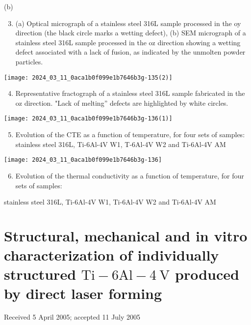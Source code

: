 \documentclass[10pt]{article}
\begin{document}
(b)

\begin{enumerate}
  \setcounter{enumi}{2}
  \item (a) Optical micrograph of a stainless steel 316L sample processed in the oy direction (the black circle marks a wetting defect), (b) SEM micrograph of a stainless steel 316L sample processed in the oz direction showing a wetting defect associated with a lack of fusion, as indicated by the unmolten powder particles.
\end{enumerate}

\begin{center}
\texttt{[image: 2024\_03\_11\_0aca1b0f099e1b7646b3g-135(2)]}
\end{center}

\begin{enumerate}
  \setcounter{enumi}{3}
  \item Representative fractograph of a stainless steel 316L sample fabricated in the oz direction. "Lack of melting” defects are highlighted by white circles.
\end{enumerate}

\begin{center}
\texttt{[image: 2024\_03\_11\_0aca1b0f099e1b7646b3g-136(1)]}
\end{center}

\begin{enumerate}
  \setcounter{enumi}{4}
  \item Evolution of the CTE as a function of temperature, for four sets of samples: stainless steel 316L, Ti-6Al-4V W1, T-6Al-4V W2 and Ti-6Al-4V AM
\end{enumerate}

\begin{center}
\texttt{[image: 2024\_03\_11\_0aca1b0f099e1b7646b3g-136]}
\end{center}

\begin{enumerate}
  \setcounter{enumi}{5}
  \item Evolution of the thermal conductivity as a function of temperature, for four sets of samples:
\end{enumerate}

stainless steel 316L, Ti-6Al-4V W1, Ti-6Al-4V W2 and Ti-6Al-4V AM

\section*{Structural, mechanical and in vitro characterization of individually structured $\mathrm{Ti}-6 \mathrm{Al}-4 \mathrm{~V}$ produced by direct laser forming }
Received 5 April 2005; accepted 11 July 2005
\end{document}
